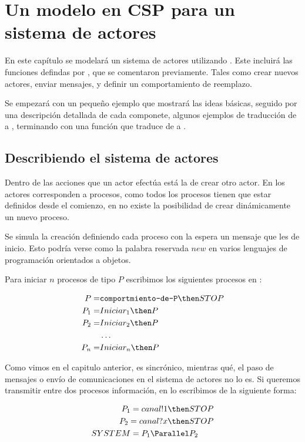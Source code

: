 \chapter{Un modelo en CSP para un sistema de actores}
En este capítulo se modelará un sistema de actores utilizando \CSPm. Este incluirá las funciones defindas por \SAL, que se comentaron previamente. Tales como crear nuevos actores, enviar mensajes, y definir un comportamiento de reemplazo. 

Se empezará con un pequeño ejemplo que mostrará las ideas básicas, seguido por una descripción detallada de cada componete, algunos ejemplos de traducción de \SAL a \CSPm, terminando con una función que traduce de \SAL a \CSPm.

\section{Describiendo el sistema de actores} 
Dentro de las acciones que un actor efectúa está la de crear otro actor. En \CSP los actores corresponden a procesos, como todos los procesos tienen que estar definidos desde el comienzo, en \CSP no existe la posibilidad de crear dinámicamente un nuevo proceso.

Se simula la creación definiendo cada proceso con la espera un mensaje que les de inicio. Esto podría verse como la palabra reservada $new$ en varios lenguajes de programación orientados a objetos. 

Para iniciar $n$ procesos de tipo $P$ escribimos los siguientes procesos en \CSP:

\begin{align*}
P =& \texttt{comportmiento-de-P} \then STOP \\
P_1 =& Iniciar_1 \then P \\
P_2 =& Iniciar_2 \then P \\
&\ldots \\
P_n =& Iniciar_n \then P \\
\end{align*}

Como vimos en el capitulo anterior, \CSP es sincrónico, mientras qué, el paso de mensajes o envío de comunicaciones en el sistema de actores no lo es. Si queremos transmitir entre dos procesos información, en \CSP lo escribimos de la siguiente forma:

\begin{align*}
P_1 = canal!1 \then& STOP \\
P_2 = canal?x \then& STOP \\
SYSTEM = P_1 \Parallel& P_2 \\
\end{align*}

